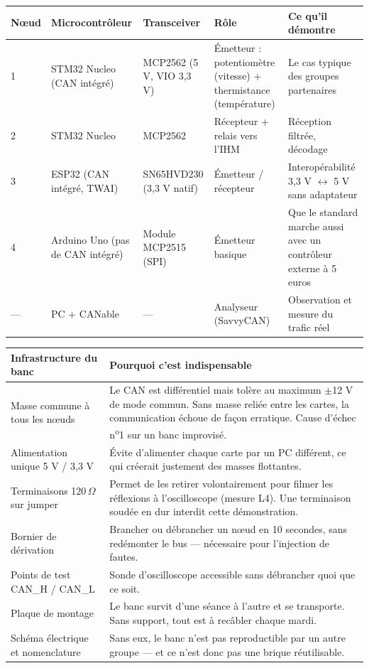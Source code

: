 \documentclass[10pt,a4paper,landscape]{article}
\begin{document}
\vspace{6pt}
\noindent
\begin{tabularx}{\textwidth}{L{2.0cm} L{3.4cm} L{3.4cm} L{3.0cm} X}
  \toprule
  \textbf{Nœud} & \textbf{Microcontrôleur} & \textbf{Transceiver} & \textbf{Rôle} & \textbf{Ce qu'il démontre} \\
  \midrule
  1 & STM32 Nucleo (CAN intégré) & MCP2562 (5 V, VIO 3,3 V) & Émetteur : potentiomètre (vitesse) + thermistance (température) & Le cas typique des groupes partenaires \\
  2 & STM32 Nucleo & MCP2562 & Récepteur + relais vers l'IHM & Réception filtrée, décodage \\
  3 & ESP32 (CAN intégré, TWAI) & SN65HVD230 (3,3 V natif) & Émetteur / récepteur & Interopérabilité 3,3 V $\leftrightarrow$ 5 V sans adaptateur \\
  4 & Arduino Uno (pas de CAN intégré) & Module MCP2515 (SPI) & Émetteur basique & Que le standard marche aussi avec un contrôleur externe à 5 euros \\
  — & PC + CANable & — & Analyseur (SavvyCAN) & Observation et mesure du trafic réel \\
  \bottomrule
\end{tabularx}

\vspace{10pt}

\noindent
\begin{tabularx}{\textwidth}{L{5.0cm} X}
  \toprule
  \textbf{Infrastructure du banc} & \textbf{Pourquoi c'est indispensable} \\
  \midrule
  Masse commune à tous les nœuds &
  Le CAN est différentiel mais tolère au maximum $\pm$12 V de mode commun. Sans masse reliée entre les cartes, la communication échoue de façon erratique. Cause d'échec n\textsuperscript{o}1 sur un banc improvisé. \\
  Alimentation unique 5 V / 3,3 V &
  Évite d'alimenter chaque carte par un PC différent, ce qui créerait justement des masses flottantes. \\
  Terminaisons 120\,$\Omega$ sur jumper &
  Permet de les retirer volontairement pour filmer les réflexions à l'oscilloscope (mesure L4). Une terminaison soudée en dur interdit cette démonstration. \\
  Bornier de dérivation &
  Brancher ou débrancher un nœud en 10 secondes, sans redémonter le bus — nécessaire pour l'injection de fautes. \\
  Points de test CAN\_H / CAN\_L &
  Sonde d'oscilloscope accessible sans débrancher quoi que ce soit. \\
  Plaque de montage &
  Le banc survit d'une séance à l'autre et se transporte. Sans support, tout est à recâbler chaque mardi. \\
  Schéma électrique et nomenclature &
  Sans eux, le banc n'est pas reproductible par un autre groupe — et ce n'est donc pas une brique réutilisable. \\
  \bottomrule
\end{tabularx}
\end{document}
